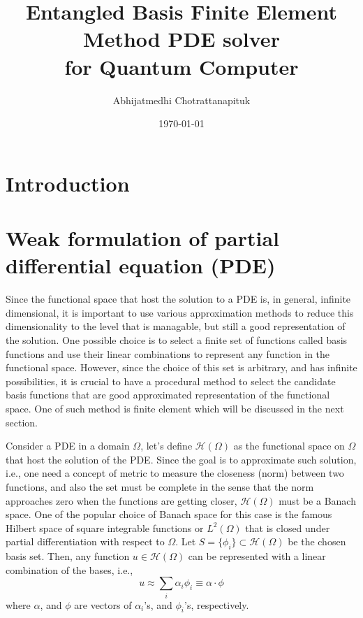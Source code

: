 \documentclass[preprint, 12pt]{revtex4-2}
\numberwithin{equation}{section}
\begin{document}
\title{Entangled Basis Finite Element Method PDE solver\\for Quantum Computer}

\author{Abhijatmedhi Chotrattanapituk}

\date{\today}

\maketitle

\section{Introduction}

\section{Weak formulation of partial differential equation (PDE)}
Since the functional space that host the solution to a PDE is, in general, infinite dimensional, it is important to use various approximation methods to reduce this dimensionality to the level that is managable, but still a good representation of the solution. One possible choice is to select a finite set of functions called basis functions and use their linear combinations to represent any function in the functional space. However, since the choice of this set is arbitrary, and has infinite possibilities, it is crucial to have a procedural method to select the candidate basis functions that are good approximated representation of the functional space. One of such method is finite element which will be discussed in the next section. 

Consider a PDE in a domain $\Omega$, let's define $\mathcal{H}(\Omega)$ as the functional space on $\Omega$ that host the solution of the PDE. Since the goal is to approximate such solution, i.e., one need a concept of metric to measure the closeness (norm) between two functions, and also the set must be complete in the sense that the norm approaches zero when the functions are getting closer, $\mathcal{H}(\Omega)$ must be a Banach space. One of the popular choice of Banach space for this case is the famous Hilbert space of square integrable functions or $L^2(\Omega)$ that is closed under partial differentiation with respect to $\Omega$. Let $S=\{\phi_i\}\subset \mathcal{H}(\Omega)$ be the chosen basis set. Then, any function $u\in\mathcal{H}(\Omega)$ can be represented with a linear combination of the bases, i.e.,
\begin{equation}\label{eq:functional basis representation}
    u\approx\sum_i\alpha_i\phi_i\equiv \alpha\cdot\phi
\end{equation}
where $\alpha$, and $\phi$ are vectors of $\alpha_i$'s, and $\phi_i$'s, respectively. 
\end{document}
